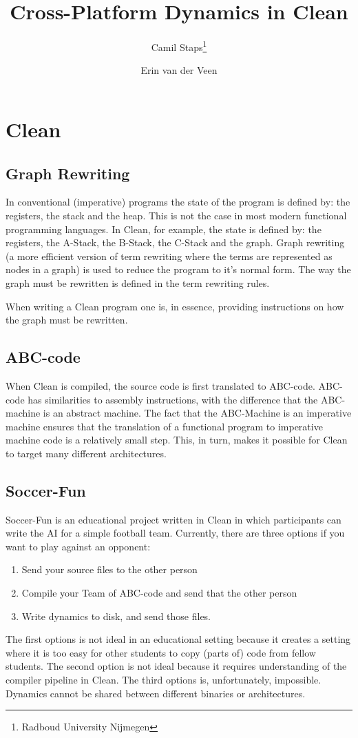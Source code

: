 \documentclass[a4paper]{article}
\title{Cross-Platform Dynamics in Clean}
\author{Camil Staps\footnote{Radboud University Nijmegen} \and Erin van der Veen\footnotemark[1]}
\begin{document}
\maketitle

\section{Clean}
\subsection{Graph Rewriting}
In conventional (imperative) programs the state of the program is defined by: the registers, the stack and the heap.
This is not the case in most modern functional programming languages.
In Clean, for example, the state is defined by: the registers, the A-Stack, the B-Stack, the C-Stack and the graph.
Graph rewriting (a more efficient version of term rewriting where the terms are represented as nodes in a graph) is used to reduce the program to it's normal form.
The way the graph must be rewritten is defined in the term rewriting rules.

When writing a Clean program one is, in essence, providing instructions on how the graph must be rewritten.

\subsection{ABC-code}
When Clean is compiled, the source code is first translated to ABC-code.
ABC-code has similarities to assembly instructions, with the difference that the ABC-machine is an abstract machine.
The fact that the ABC-Machine is an imperative machine ensures that the translation of a functional program to imperative machine code is a relatively small step.
This, in turn, makes it possible for Clean to target many different architectures.

\subsection{Soccer-Fun}
Soccer-Fun is an educational project written in Clean in which participants can write the AI for a simple football team.
Currently, there are three options if you want to play against an opponent:
\begin{enumerate}
	\item Send your source files to the other person
	\item Compile your Team of ABC-code and send that the other person
	\item Write dynamics to disk, and send those files.
\end{enumerate}
The first options is not ideal in an educational setting because it creates a setting where it is too easy for other students to copy (parts of) code from fellow students.
The second option is not ideal because it requires understanding of the compiler pipeline in Clean.
The third options is, unfortunately, impossible.
Dynamics cannot be shared between different binaries or architectures.
\end{document}
